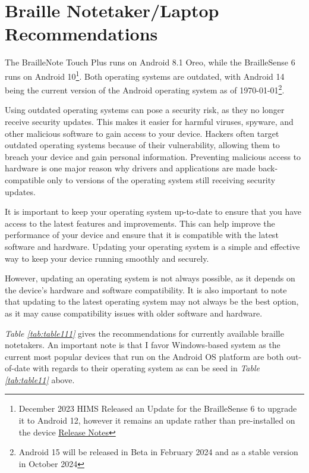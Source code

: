 \hypertarget{braille-notetakers-and-braille-laptop-computers-recommend}{}\section{Braille Notetaker/Laptop Recommendations}\label{braille-notetakers-and-braille-laptop-computers-recommend}
The BrailleNote Touch Plus runs on Android 8.1 Oreo, while the BrailleSense 6 runs on Android 10\footnote{\raggedright December 2023 HIMS Released an Update for the BrailleSense 6 to upgrade it to Android 12, however it remains an update rather than pre-installed on the device \href{https://hims-inc.com/wp-content/uploads/2023/11/Release-Note-for-BrailleSense-6-V2.0.docx}{Release Notes}}. Both operating systems are outdated, with Android 14 being the current version of the Android operating system as of \today\footnote{\raggedright Android 15 will be released in Beta in February 2024 and as a stable version in October 2024}.

Using outdated operating systems can pose a security risk, as they no longer receive security updates. This makes it easier for harmful viruses, spyware, and other malicious software to gain access to your device. Hackers often target outdated operating systems because of their vulnerability, allowing them to breach your device and gain personal information. Preventing malicious access to hardware is one major reason why drivers and applications are made back-compatible only to versions of the operating system still receiving security updates. 

It is important to keep your operating system up-to-date to ensure that you have access to the latest features and improvements. This can help improve the performance of your device and ensure that it is compatible with the latest software and hardware. Updating your operating system is a simple and effective way to keep your device running smoothly and securely.

However, updating an operating system is not always possible, as it depends on the device’s hardware and software compatibility. It is also important to note that updating to the latest operating system may not always be the best option, as it may cause compatibility issues with older software and hardware.

\textit{Table \ref{tab:table111}} gives the recommendations for currently available braille notetakers. An important note is that I favor Windows-based system as the current most popular devices that run on the Android OS platform are both out-of-date with regards to their operating system as can be seed in \textit{Table \ref{tab:table11}} above.

